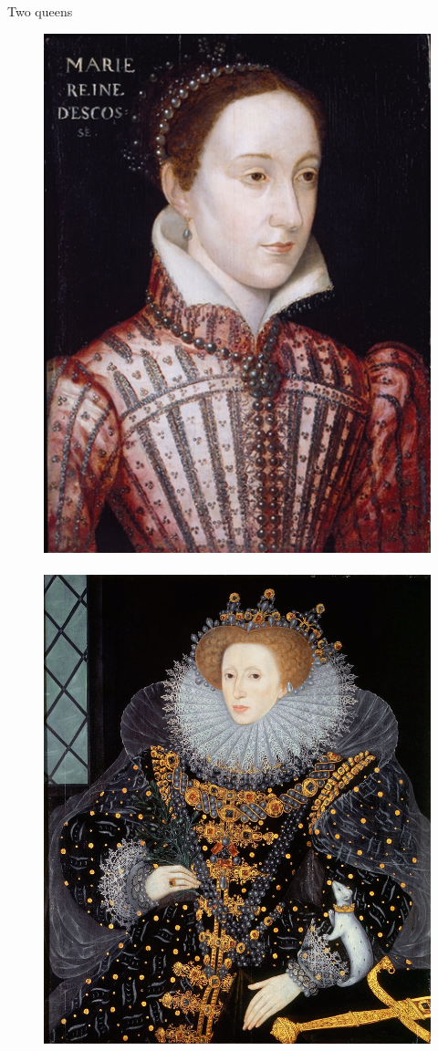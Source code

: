 \begin{peoplebox}{Two queens}

\begin{figure}[H]
            \includegraphics[height=.33\textheight]{chapters/img/Mary_Stuart_Queen.jpg}
~~~~
        \includegraphics[height=.33\textheight]{chapters/img/Elizabeth1England.jpg}

\end{figure}
\end{peoplebox}
